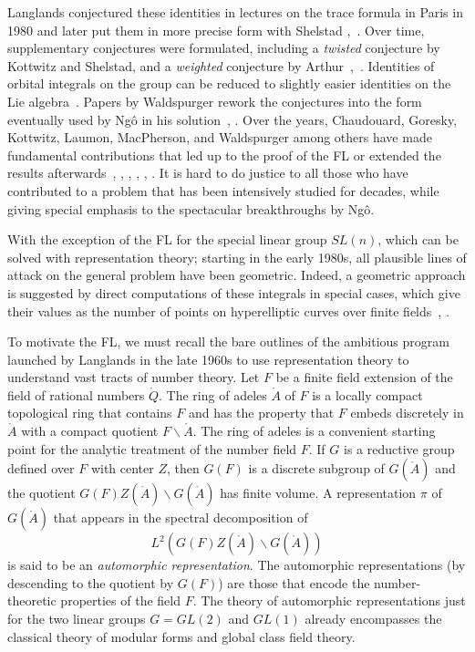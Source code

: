Langlands conjectured these identities in lectures on the trace
formula in Paris in 1980 and later put them in more precise form with
Shelstad \cite{Langlands:debuts},~\cite{LS:1987}.  Over time,
supplementary conjectures were formulated, including a {\it twisted}
conjecture by Kottwitz and Shelstad, and a {\it weighted} conjecture
by Arthur~\cite{KS:1999},~\cite{Arthur:2002}.  Identities of orbital
integrals on the group can be reduced to slightly easier identities on
the Lie algebra~\cite{LS:1990}.  Papers by Waldspurger rework the
conjectures into the form eventually used by Ng\^o in his
solution~\cite{Wald:2008}, \cite{Wald:1991}.  Over the years,
Chaudouard, Goresky, Kottwitz, Laumon, MacPherson, and Waldspurger
among others have made fundamental contributions that led up to the
proof of the FL or extended the results afterwards~\cite{LN:08},
\cite{GKM:2004}, \cite{GKM:2006}, \cite{CL:2009:I}, \cite{CL:2009:II},
\cite{CHL:2010}.  It is hard to do justice to all those who have
contributed to a problem that has been intensively studied for
decades, while giving special emphasis to the spectacular
breakthroughs by Ng\^o.

With the exception of the FL for the special linear group $SL(n)$,
which can be solved with representation theory; starting in the early
1980s, all plausible lines of attack on the general problem have been
geometric.  Indeed, a geometric approach is suggested by direct 
computations of these integrals in special cases, which
give their values as the number of points on hyperelliptic curves
over finite fields~\cite{KL:1988}, \cite{Hales:hyperelliptic}.

To motivate the FL, we must recall the bare outlines of the ambitious
program launched by Langlands in the late 1960s to use representation
theory to understand vast tracts of number theory.  Let $F$ be a
finite field extension of the field of rational numbers $\ring{Q}$.
The ring of adeles $\ring{A}$ of $F$ is a locally compact topological
ring that contains $F$ and has the property that $F$ embeds discretely
in $\ring{A}$ with a compact quotient $F\backslash\ring{A}$.  The ring
of adeles is a convenient starting point for the analytic treatment of
the number field $F$.  If $G$ is a reductive group defined over $F$
with center $Z$, then $G(F)$ is a discrete subgroup of $G(\ring{A})$
and the quotient $G(F)Z(\ring{A})\backslash G(\ring{A})$ has finite
volume.  A representation $\pi$ of $G(\ring{A})$ that appears in the
spectral decomposition of
\[
L^2(G(F)Z(\ring{A})\backslash G(\ring{A}))
\]
is said to be an {\it automorphic representation}.  The automorphic
representations (by descending to the quotient by $G(F)$) are those
that encode the number-theoretic properties of the field $F$.
The theory of automorphic representations just for the two linear
groups $G=GL(2)$ and $GL(1)$ already 
encompasses the classical theory
of modular forms and global class field theory.

